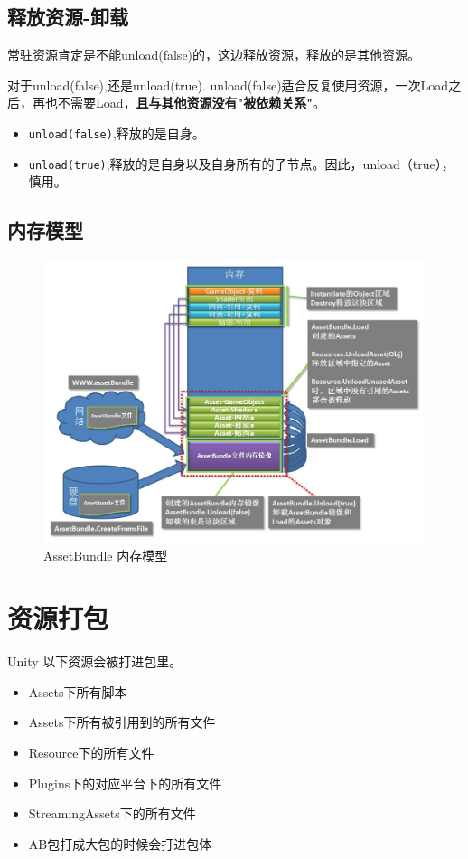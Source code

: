 \documentclass[UTF8,a4paper,12pt]{ctexbook}
\begin{document}
		\subsection{释放资源-卸载}
			常驻资源肯定是不能unload(false)的，这边释放资源，释放的是其他资源。
			
			对于unload(false),还是unload(true). unload(false)适合反复使用资源，一次Load之后，再也不需要Load，\textbf{且与其他资源没有"被依赖关系"}。
			
			\begin{itemize}
				\item \verb|unload(false)|,释放的是自身。
				\item \verb|unload(true)|,释放的是自身以及自身所有的子节点。因此，unload（true），慎用。
			\end{itemize}
		
		\subsection{内存模型}
			\begin{figure}[H]
				\centering
				\includegraphics[scale=0.7]{assetBundel}
				\caption{AssetBundle 内存模型}
		\end{figure}
		
	\section{资源打包}
		Unity  以下资源会被打进包里。
		\begin{itemize}
			\item Assets下所有脚本
			\item Assets下所有被引用到的所有文件
			\item Resource下的所有文件
			\item Plugins下的对应平台下的所有文件
			\item StreamingAssets下的所有文件
			\item AB包打成大包的时候会打进包体
		\end{itemize}
		
\end{document}
